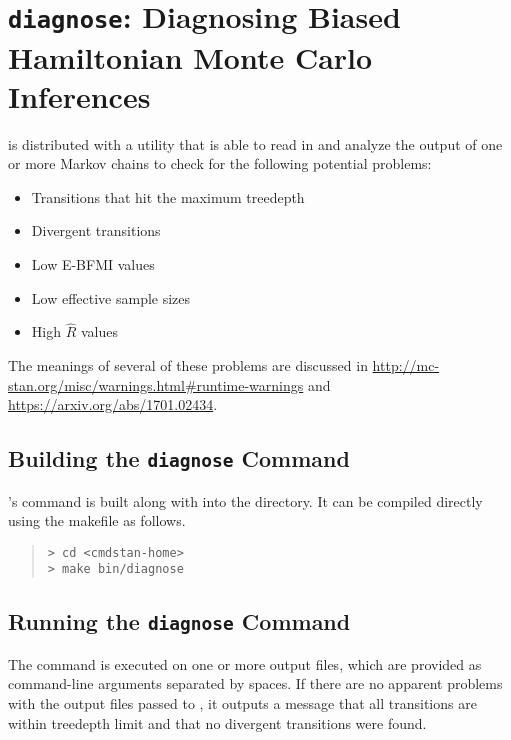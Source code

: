 \chapter{{\tt\bfseries diagnose}: Diagnosing Biased Hamiltonian Monte Carlo Inferences}\label{diagnose.chapter}

\noindent
\CmdStan is distributed with a utility that is able to read in and
analyze the output of one or more Markov chains to check for the
following potential problems:

\begin{itemize}
\item Transitions that hit the maximum treedepth
\item Divergent transitions
\item Low E-BFMI values
\item Low effective sample sizes
\item High $\hat{R}$ values
\end{itemize}

The meanings of several of these problems are discussed in
\url{http://mc-stan.org/misc/warnings.html#runtime-warnings}
and \url{https://arxiv.org/abs/1701.02434}.


\section{Building the {\tt\bfseries diagnose} Command}

\CmdStan's  command is built along with  into
the  directory. It can be compiled directly using the
makefile as follows.
%
\begin{quote}
\begin{Verbatim}[fontshape=sl]
> cd <cmdstan-home>
> make bin/diagnose
\end{Verbatim}
\end{quote}
%

\section{Running the {\tt\bfseries diagnose} Command}

The  command is executed on one or more output files,
which are provided as command-line arguments separated by spaces.
If there are no apparent problems with the output files passed to
, it outputs a message that all transitions
are within treedepth limit and that no divergent transitions were found.

